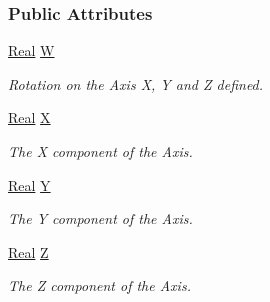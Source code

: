 \subsubsection*{Public Attributes}
\begin{DoxyCompactItemize}
\item 
\hypertarget{classphys_1_1Quaternion_af509194048d0cd8fb03d45f150afaa0c}{
\hyperlink{namespacephys_af7eb897198d265b8e868f45240230d5f}{Real} \hyperlink{classphys_1_1Quaternion_af509194048d0cd8fb03d45f150afaa0c}{W}}
\label{classphys_1_1Quaternion_af509194048d0cd8fb03d45f150afaa0c}

\begin{DoxyCompactList}\small\item\em Rotation on the Axis X, Y and Z defined. \item\end{DoxyCompactList}\item 
\hypertarget{classphys_1_1Quaternion_a29c08e725c7bbb389547cbe03f40f5bd}{
\hyperlink{namespacephys_af7eb897198d265b8e868f45240230d5f}{Real} \hyperlink{classphys_1_1Quaternion_a29c08e725c7bbb389547cbe03f40f5bd}{X}}
\label{classphys_1_1Quaternion_a29c08e725c7bbb389547cbe03f40f5bd}

\begin{DoxyCompactList}\small\item\em The X component of the Axis. \item\end{DoxyCompactList}\item 
\hypertarget{classphys_1_1Quaternion_a756165050c3c241fd8b8de6ed21bb268}{
\hyperlink{namespacephys_af7eb897198d265b8e868f45240230d5f}{Real} \hyperlink{classphys_1_1Quaternion_a756165050c3c241fd8b8de6ed21bb268}{Y}}
\label{classphys_1_1Quaternion_a756165050c3c241fd8b8de6ed21bb268}

\begin{DoxyCompactList}\small\item\em The Y component of the Axis. \item\end{DoxyCompactList}\item 
\hypertarget{classphys_1_1Quaternion_a708ae111e0cf387b94f33dc7d5b3c59a}{
\hyperlink{namespacephys_af7eb897198d265b8e868f45240230d5f}{Real} \hyperlink{classphys_1_1Quaternion_a708ae111e0cf387b94f33dc7d5b3c59a}{Z}}
\label{classphys_1_1Quaternion_a708ae111e0cf387b94f33dc7d5b3c59a}

\begin{DoxyCompactList}\small\item\em The Z component of the Axis. \item\end{DoxyCompactList}\end{DoxyCompactItemize}


